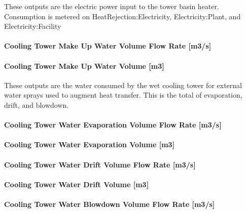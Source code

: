 These outputs are the electric power input to the tower basin heater. Consumption is metered on HeatRejection:Electricity, Electricity:Plant, and Electricity:Facility

\paragraph{Cooling Tower Make Up Water Volume Flow Rate {[}m3/s{]}}\label{cooling-tower-make-up-water-volume-flow-rate-m3s}

\paragraph{Cooling Tower Make Up Water Volume {[}m3{]}}\label{cooling-tower-make-up-water-volume-m3}

These outputs are the water consumed by the wet cooling tower for external water sprays used to augment heat transfer. This is the total of evaporation, drift, and blowdown.

\paragraph{Cooling Tower Water Evaporation Volume Flow Rate {[}m3/s{]}}\label{cooling-tower-water-evaporation-volume-flow-rate-m3s}

\paragraph{Cooling Tower Water Evaporation Volume {[}m3{]}}\label{cooling-tower-water-evaporation-volume-m3}

\paragraph{Cooling Tower Water Drift Volume Flow Rate {[}m3/s{]}}\label{cooling-tower-water-drift-volume-flow-rate-m3s}

\paragraph{Cooling Tower Water Drift Volume {[}m3{]}}\label{cooling-tower-water-drift-volume-m3}

\paragraph{Cooling Tower Water Blowdown Volume Flow Rate {[}m3/s{]}}\label{cooling-tower-water-blowdown-volume-flow-rate-m3s}

